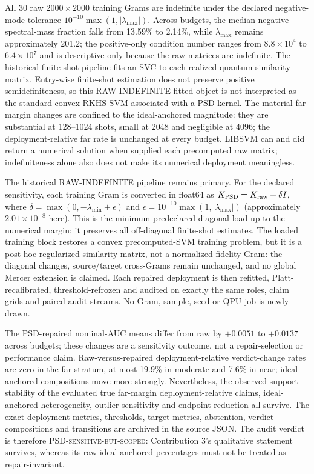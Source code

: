 \documentclass[11pt,a4paper]{article}
\begin{document}
All 30 raw $2000\times2000$ training Grams are indefinite under the declared
negative-mode tolerance $10^{-10}\max(1,|\lambda_{\max}|)$. Across budgets,
the median negative spectral-mass fraction falls from 13.59\% to 2.14\%, while
$\lambda_{\max}$ remains approximately 201.2; the positive-only condition
number ranges from $8.8\times10^4$ to $6.4\times10^7$ and is descriptive only
because the raw matrices are indefinite. The historical finite-shot pipeline
fits an SVC to each realized quantum-similarity matrix. Entry-wise finite-shot
estimation does not preserve positive semidefiniteness, so this RAW-INDEFINITE
fitted object is not interpreted as the standard convex RKHS SVM associated
with a PSD kernel.
The material far-margin changes are confined to the ideal-anchored magnitude:
they are substantial at 128--1024 shots, small at 2048 and negligible at 4096;
the deployment-relative far rate is unchanged at every budget.
LIBSVM can and did return a numerical solution when supplied each precomputed
raw matrix; indefiniteness alone also does not make its numerical deployment
meaningless.

The historical RAW-INDEFINITE pipeline remains primary. For the declared
sensitivity, each training Gram is converted in float64 as
$K_{\rm PSD}=K_{\rm raw}+\delta I$, where
$\delta=\max(0,-\lambda_{\min}+\epsilon)$ and
$\epsilon=10^{-10}\max(1,|\lambda_{\max}|)$ (approximately $2.01\times10^{-8}$
here). This is the minimum predeclared diagonal load up to the numerical
margin; it preserves all off-diagonal finite-shot estimates. The loaded
training block restores a convex precomputed-SVM training problem, but it is a
post-hoc regularized similarity matrix, not a normalized fidelity Gram: the
diagonal changes, source/target cross-Grams remain unchanged, and no global
Mercer extension is claimed. Each repaired deployment is then refitted,
Platt-recalibrated, threshold-refrozen and audited on exactly the same roles,
claim grids and paired audit streams. No Gram, sample, seed or QPU job is newly
drawn.

The PSD-repaired nominal-AUC means differ from raw by $+0.0051$ to $+0.0137$
across budgets; these changes are a sensitivity outcome, not a repair-selection
or performance claim. Raw-versus-repaired deployment-relative verdict-change
rates are zero in the far stratum, at most 19.9\% in moderate and 7.6\% in near;
ideal-anchored compositions move more strongly. Nevertheless, the observed
support stability of the evaluated true far-margin deployment-relative claims,
ideal-anchored heterogeneity,
outlier sensitivity and endpoint reduction all survive. The exact
deployment metrics, thresholds, target metrics, abstention, verdict
compositions and transitions are archived in the source JSON. The audit
verdict is therefore \textsc{PSD-sensitive-but-scoped}: Contribution 3's
qualitative statement survives, whereas its raw ideal-anchored percentages
must not be treated as repair-invariant.
\end{document}
